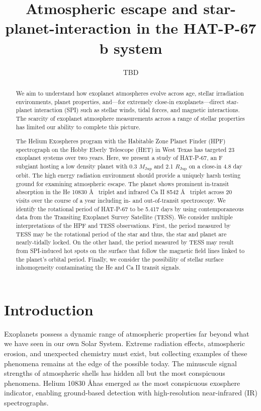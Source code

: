 \documentclass[twocolumn]{aastex631}
\begin{document}

\title{Atmospheric escape and star-planet-interaction in the HAT-P-67 b system}

\author{TBD}


\begin{abstract}
    We aim to understand how exoplanet atmospheres evolve across age, stellar irradiation environments, planet properties, and---for extremely close-in exoplanets---direct star-planet interaction (SPI) such as stellar winds, tidal forces, and magnetic interactions. The scarcity of exoplanet atmosphere measurements across a range of stellar properties has limited our ability to complete this picture.

    The Helium Exospheres program with the Habitable Zone Planet Finder (HPF) spectrograph on the Hobby Eberly Telescope (HET) in West Texas has targeted 23 exoplanet systems over two years. Here, we present a study of HAT-P-67, an F subgiant hosting a low density planet with 0.3 $M_{\mathrm{Jup}}$ and 2.1 $R_{\mathrm{Jup}}$ on a close-in 4.8 day orbit. The high energy radiation environment should provide a uniquely harsh testing ground for examining atmospheric escape. The planet shows prominent in-transit absorption in the He 10830 \AA~ triplet and infrared Ca II 8542 \AA~ triplet across 20 visits over the course of a year including in- and out-of-transit spectroscopy. We identify the rotational period of HAT-P-67 to be 5.417 days by using contemporaneous data from the Transiting Exoplanet Survey Satellite (TESS). We consider multiple interpretations of the HPF and TESS observations. First, the period measured by TESS may be the rotational period of the star and thus, the star and planet are nearly-tidally locked. On the other hand, the period measured by TESS may result from SPI-induced hot spots on the surface that follow the magnetic field lines linked to the planet's orbital period. Finally, we consider the possibility of stellar surface inhomogeneity contaminating the He and Ca II transit signals.
\end{abstract}


\section{Introduction}\label{sec:intro}

Exoplanets possess a dynamic range of atmospheric properties far beyond what we have seen in our own Solar System.  Extreme radiation effects, atmospheric erosion, and unexpected chemistry must exist, but collecting examples of these phenomena remains at the edge of the possible today. The minuscule signal strengths of atmospheric shells has hidden all but the most conspicuous phenomena.  Helium 10830 \AA has emerged as the most conspicuous exosphere indicator, enabling ground-based detection with high-resolution near-infrared (IR) spectrographs.
\end{document}

